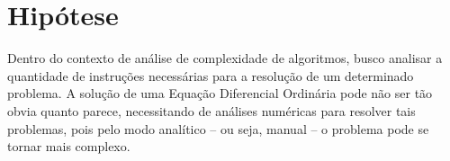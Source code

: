 \section{Hipótese}\label{lhipotese}

Dentro do contexto de análise de complexidade de algoritmos, busco 
analisar a quantidade de instruções necessárias para a resolução de um 
determinado problema. A solução de uma Equação Diferencial 
Ordinária pode não ser tão obvia quanto parece, necessitando de 
análises numéricas para resolver tais problemas, pois pelo modo 
analítico -- ou seja, manual -- o problema pode se tornar mais complexo.
